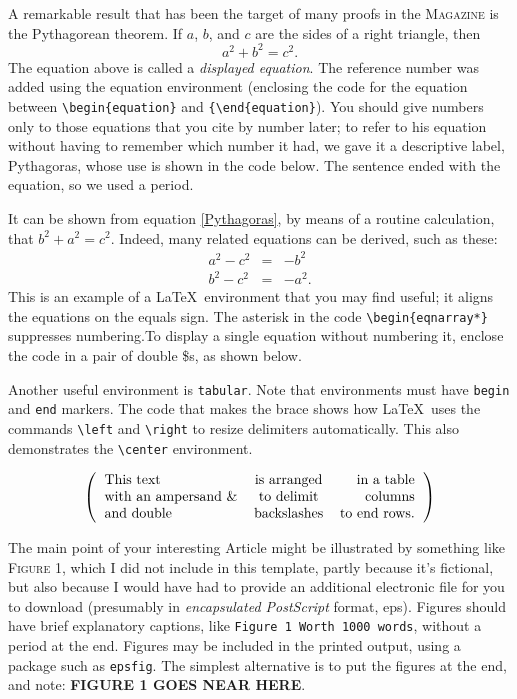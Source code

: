 \documentclass[12pt]{article}
\begin{document}
A remarkable result that has been the target of many proofs in the
\textsc{Magazine} is the Pythagorean theorem.    If $a$, $b$, and
$c$ are the sides of a right triangle, then
\begin{equation}
a^2+b^2=c^2 .  \label{Pythagoras}
\end{equation}
The equation above is called a \textit{displayed equation}.  The
reference number was added using the equation environment
(enclosing the code for the equation between
\verb+\begin{equation}+ and \verb+{\end{equation}+). You should
give numbers only to those equations that you cite by number
later; to refer to his equation without having to remember which
number it had, we gave it a descriptive label, Pythagoras, whose
use is shown in the code below.  The sentence ended with the
equation, so we used a period.

It can be shown from equation \ref{Pythagoras}, by means of a
routine calculation, that $b^2+a^2=c^2$.   Indeed, many related
equations can be derived, such as these:
\begin{eqnarray*}
a^2-c^2 &=& -b^2   \\
b^2-c^2 &=& -a^2 .
\end{eqnarray*}
This is an example of a \LaTeX\ environment that you may find
useful; it aligns the equations on the equals sign. The asterisk
in the code \verb+\begin{eqnarray*}+ suppresses numbering.To
display a single equation without numbering it, enclose the code
in a pair of double \$s, as shown below.

Another useful environment is \verb+tabular+. Note that
environments must have \verb+begin+ and \verb+end+ markers.  The
code that makes the brace shows how \LaTeX\ uses the commands
\verb+\left+ and \verb+\right+ to
resize delimiters automatically. This also demonstrates the \verb+\center+
environment.
\vskip 2mm
\begin{center}
$$\left (
\begin{tabular}{lcr}
This text & is arranged& in a table\\
with an ampersand \& & to delimit& columns\\
and double & backslashes& to end rows.
\end{tabular}
\right )$$
\vspace{3mm}
\end{center}
The main point of your interesting Article
might be illustrated by something like \textsc{Figure 1},
which I did not include in this template, partly because it's fictional,
but also because I would have had to provide an additional
electronic file for you to download (presumably
in \textit{encapsulated PostScript} format, eps).
Figures should have brief explanatory captions,  like
\verb+Figure 1 Worth 1000 words+, without
a period at the end.
Figures may be included in the printed output, using
a package such as \verb+epsfig+.
The simplest alternative is to put the figures
at the end, and note:   \textbf{FIGURE 1 GOES NEAR HERE}.
\end{document}
